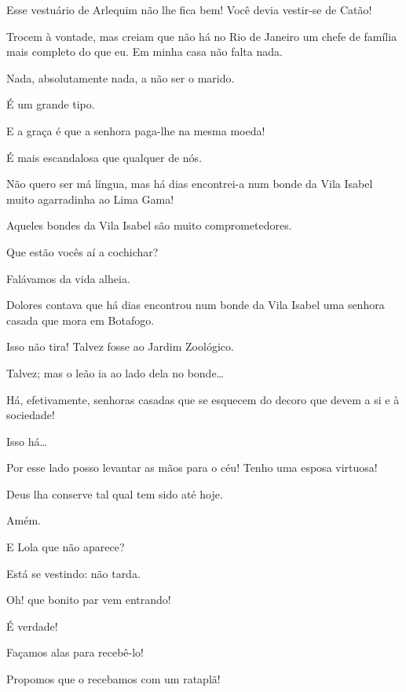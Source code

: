  Esse vestuário de Arlequim não lhe fica bem! Você devia
vestir-se de Catão!

 Trocem à vontade, mas creiam que não há no Rio de Janeiro um
chefe de família mais completo do que eu.  Em minha casa não
falta nada. 

 Nada, absolutamente nada, a não ser o marido.

 É um grande tipo.

 E a graça é que a senhora paga-lhe na mesma moeda!

 É mais escandalosa que qualquer de nós.

 Não quero ser má língua, mas há dias encontrei-a num bonde da
Vila Isabel muito agarradinha ao Lima Gama!

 Aqueles bondes da Vila Isabel são muito comprometedores.

  Que estão vocês aí a cochichar?

 Falávamos da vida alheia.

 Dolores contava que há dias encontrou num bonde da Vila Isabel
uma senhora casada que mora em Botafogo.

 Isso não tira! Talvez fosse ao Jardim Zoológico.

 Talvez; mas o leão ia ao lado dela no bonde\ldots{}

 Há, efetivamente, senhoras casadas que se esquecem do decoro
que devem a si e à sociedade!

  Isso há\ldots{}

 Por esse lado posso levantar as mãos para o céu! Tenho uma
esposa virtuosa!

 Deus lha conserve tal qual tem sido até hoje.

 Amém.

 E Lola que não aparece?

 Está se vestindo: não tarda.

 Oh! que bonito par vem entrando!

 É verdade!

 Façamos alas para recebê-lo!

 Propomos que o recebamos com um rataplã!

